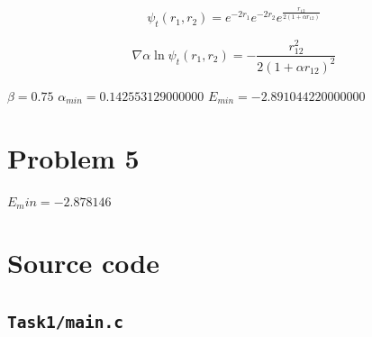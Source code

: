 \begin{equation}
	\psi_t(r_1,r_2) = e^{-2r_1}e^{-2r_2}e^{\frac{r_{12}}{2(1+\alpha r_{12})}}
\end{equation}

\begin{equation}
	\nabla \alpha \ln{\psi_t(r_1,r_2)} = -\frac{r_{12}^2}{2(1+\alpha r_{12})^2}
\end{equation}

$\beta = 0.75$
$\alpha_{min}=0.142553129000000$
$E_{min}=-2.891044220000000$

\section*{Problem 5}

$E_min=-2.878146$


\appendix
\section{Source code}

\subsection{\texttt{Task1/main.c}}
%


